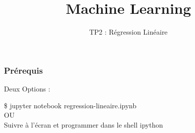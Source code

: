 \documentclass{formation}
\title{Machine Learning}
\subtitle{TP2 : Régression Linéaire}
\begin{document}
\maketitle

\begin{frame}
  \frametitle{Prérequis}
  \begin{center}
    Deux Options :
  \end{center}
  \$ jupyter notebook regression-lineaire.ipynb\\
  \newline
  OU \\
  \newline
  Suivre à l'écran et programmer dans le shell ipython\\
\end{frame}
\end{document}
